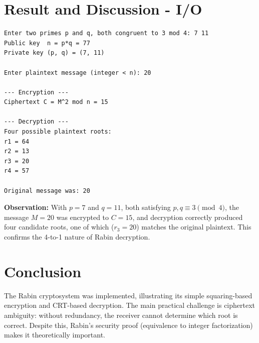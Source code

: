 \section{Result and Discussion - I/O}
\begin{verbatim}
Enter two primes p and q, both congruent to 3 mod 4: 7 11
Public key  n = p*q = 77
Private key (p, q) = (7, 11)

Enter plaintext message (integer < n): 20

--- Encryption ---
Ciphertext C = M^2 mod n = 15

--- Decryption ---
Four possible plaintext roots:
r1 = 64
r2 = 13
r3 = 20
r4 = 57

Original message was: 20
\end{verbatim}

\textbf{Observation:} With $p = 7$ and $q = 11$, both satisfying
$p, q \equiv 3 \pmod 4$, the message $M = 20$ was encrypted to
$C = 15$, and decryption correctly produced four candidate roots, one of
which ($r_3 = 20$) matches the original plaintext. This confirms the
4-to-1 nature of Rabin decryption.

\section{Conclusion}
The Rabin cryptosystem was implemented, illustrating its simple squaring-based
encryption and CRT-based decryption. The main practical challenge is ciphertext
ambiguity: without redundancy, the receiver cannot determine which root is
correct. Despite this, Rabin's security proof (equivalence to integer
factorization) makes it theoretically important.
